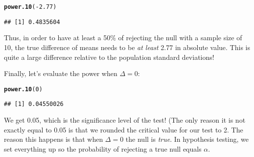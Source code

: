 \documentclass[addpoints,12pt]{exam}\usepackage[]{graphicx}\usepackage[]{color}
\makeatletter
\newcommand{\hlnum}[1]{\textcolor[rgb]{0.686,0.059,0.569}{#1}}%
\newcommand{\hlopt}[1]{\textcolor[rgb]{0,0,0}{#1}}%
\newcommand{\hlstd}[1]{\textcolor[rgb]{0.345,0.345,0.345}{#1}}%
\newcommand{\hlkwd}[1]{\textcolor[rgb]{0.737,0.353,0.396}{\textbf{#1}}}%
\newenvironment{kframe}{%
 \def\at@end@of@kframe{}%
 \ifinner\ifhmode%
  \def\at@end@of@kframe{\end{minipage}}%
  \begin{minipage}{\columnwidth}%
 \fi\fi%
 \def\FrameCommand##1{\hskip\@totalleftmargin \hskip-\fboxsep
 \colorbox{shadecolor}{##1}\hskip-\fboxsep
     \hskip-\linewidth \hskip-\@totalleftmargin \hskip\columnwidth}%
 \MakeFramed {\advance\hsize-\width
   \@totalleftmargin\z@ \linewidth\hsize
   \@setminipage}}%
 {\par\unskip\endMakeFramed%
 \at@end@of@kframe}
\newenvironment{knitrout}{}{} %
\makeatother
\begin{document}
\begin{questions}
\begin{parts}
\begin{solution}
\begin{knitrout}
\color{fgcolor}\begin{kframe}
\begin{alltt}
\hlkwd{power.10}\hlstd{(}\hlopt{-}\hlnum{2.77}\hlstd{)}
\end{alltt}
\begin{verbatim}
## [1] 0.4835604
\end{verbatim}
\end{kframe}
\end{knitrout}
Thus, in order to have at least a 50\% of rejecting the null with a sample size of 10, the true difference of means needs to be \emph{at least} 2.77 in absolute value. This is quite a large difference relative to the population standard deviations!

Finally, let's evaluate the power when $\Delta = 0$:
\begin{knitrout}
\color{fgcolor}\begin{kframe}
\begin{alltt}
\hlkwd{power.10}\hlstd{(}\hlnum{0}\hlstd{)}
\end{alltt}
\begin{verbatim}
## [1] 0.04550026
\end{verbatim}
\end{kframe}
\end{knitrout}
We get 0.05, which is the significance level of the test! (The only reason it is not exactly equal to 0.05 is that we rounded the critical value for our test to 2. 
The reason this happens is that when $\Delta = 0$ the null is \emph{true}. In hypothesis testing, we set everything up so the probability of rejecting a true null equals $\alpha$.
      \end{solution}

\end{parts}
\end{questions}
\end{document}

